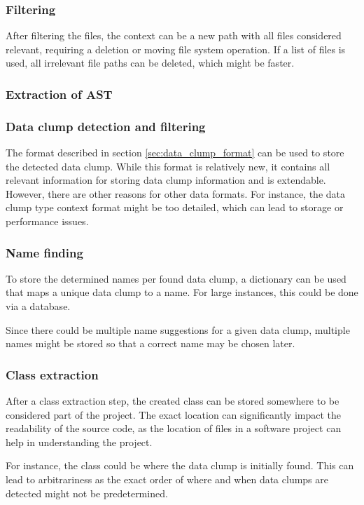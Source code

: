 \subsubsection{Filtering}
After filtering the files, the context can be a new path with all files considered relevant, requiring a deletion or moving file system operation. If a list of files is used, all irrelevant file paths can be deleted, which might be faster.

\subsubsection{Extraction of AST}
\subsubsection{Data clump detection and filtering}

The format described in section \ref{sec:data_clump_format} can be used to store the detected data clump. While this format is relatively new, it contains all relevant information for storing data clump information and is extendable. However, there are other reasons for other data formats. For instance,  the data clump type context format might be too detailed, which can lead to storage or performance issues. 

\subsubsection{Name finding}
To store the determined names per found data clump, a dictionary can be used that maps a unique data clump to a name. For large instances, this could be done via a database. 

Since there could be multiple name suggestions for a given data clump, multiple names might be stored so that a correct name may be chosen later.

\subsubsection{Class extraction}

After a class extraction step, the created class can be stored somewhere to be considered part of the project. The exact location can significantly impact the readability of the source code, as the location of files in a software project can help in understanding the project. 

For instance, the class could be where the data clump is initially found. This can lead to arbitrariness as the exact order of where and when data clumps are detected might not be predetermined. 

